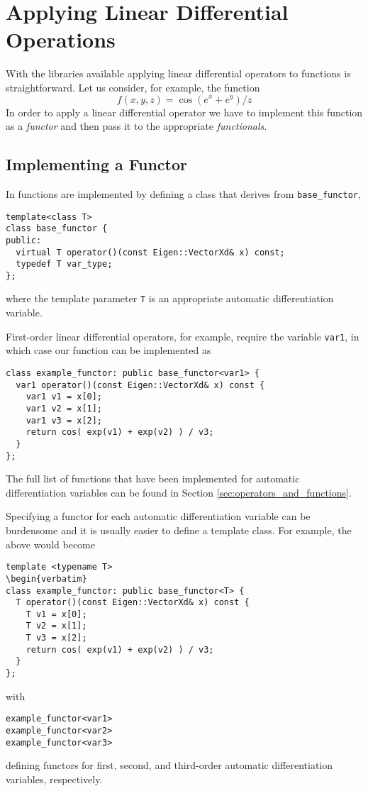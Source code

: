 \section{Applying Linear Differential Operations}

With the \nomad libraries available applying linear differential operators
to functions is straightforward.  Let us consider, for example, the
function
%
\begin{equation*}
f \! \left( x, y, z \right) = \cos \! \left( e^{x} + e^{y} \right) / z
\end{equation*}
%
In order to apply a linear differential operator we have to implement
this function as a \textit{functor} and then pass it to the appropriate
\textit{functionals}.

\subsection{Implementing a Functor}

In \nomad functions are implemented by defining a class
that derives from \verb|base_functor|,
%
\begin{verbatim}
template<class T>
class base_functor {
public:
  virtual T operator()(const Eigen::VectorXd& x) const;
  typedef T var_type;
};
\end{verbatim}
%
where the template parameter \verb|T| is an appropriate automatic 
differentiation variable.  

First-order linear differential operators, for example, require the 
variable \verb|var1|, in which case our function can be implemented as
%
\begin{verbatim}
class example_functor: public base_functor<var1> {
  var1 operator()(const Eigen::VectorXd& x) const {
    var1 v1 = x[0];
    var1 v2 = x[1];
    var1 v3 = x[2];
    return cos( exp(v1) + exp(v2) ) / v3;  
  }
};
\end{verbatim}
%
The full list of functions that have been implemented for automatic
differentiation variables can be found in Section \ref{sec:operators_and_functions}.

Specifying a functor for each automatic differentiation variable 
can be burdensome and it is usually easier to define a template class.  
For example, the above would become
%
\begin{verbatim}
template <typename T>
\begin{verbatim}
class example_functor: public base_functor<T> {
  T operator()(const Eigen::VectorXd& x) const {
    T v1 = x[0];
    T v2 = x[1];
    T v3 = x[2];
    return cos( exp(v1) + exp(v2) ) / v3;  
  }
};
\end{verbatim}
%
with
%
\begin{verbatim}
example_functor<var1>
example_functor<var2>
example_functor<var3>
\end{verbatim}
%
defining functors for first, second, and third-order automatic differentiation
variables, respectively.


